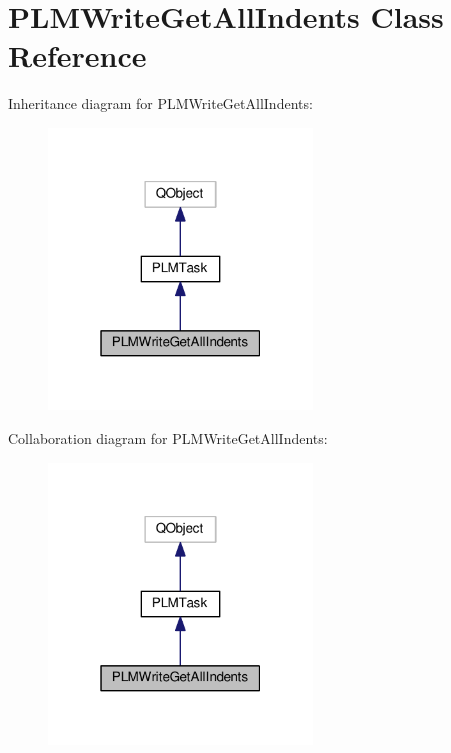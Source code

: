 \hypertarget{class_p_l_m_write_get_all_indents}{}\section{P\+L\+M\+Write\+Get\+All\+Indents Class Reference}
\label{class_p_l_m_write_get_all_indents}


Inheritance diagram for P\+L\+M\+Write\+Get\+All\+Indents\+:\nopagebreak
\begin{figure}[H]
\begin{center}
\leavevmode
\includegraphics[width=199pt]{class_p_l_m_write_get_all_indents__inherit__graph}
\end{center}
\end{figure}


Collaboration diagram for P\+L\+M\+Write\+Get\+All\+Indents\+:\nopagebreak
\begin{figure}[H]
\begin{center}
\leavevmode
\includegraphics[width=199pt]{class_p_l_m_write_get_all_indents__coll__graph}
\end{center}
\end{figure}
